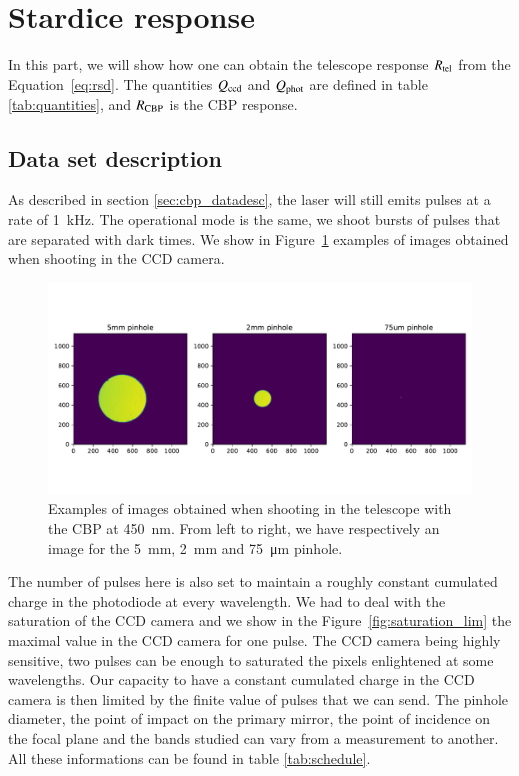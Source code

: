 \section{Stardice response}
\label{sec:rsd}

In this part, we will show how one can obtain the \SD telescope response $R_{\mathrm{tel}}$ from the Equation~\ref{eq:rsd}. The quantities $Q_{\mathrm{ccd}}$ and $Q_{\mathrm{phot}}$ are defined in table \ref{tab:quantities}, and $R_{\mathrm{CBP}}$ is the CBP response.

\subsection{Data set description}
\label{sec:sd_datadesc}

As described in section \ref{sec:cbp_datadesc}, the laser will still emits pulses at a rate of \SI{1}{\kilo\hertz}. The operational mode is the same, we shoot bursts of pulses that are separated with dark times. We show in Figure~\ref{fig:ccd_examples} examples of images obtained when shooting in the \SD CCD camera. 

\begin{figure}[h]
    \centering
    \includegraphics[width=\columnwidth]{fig/ccd_examples.pdf}
    \caption{Examples of images obtained when shooting in the \SD telescope with the CBP at \SI{450}{\nm}. From left to right, we have respectively an image for the \SI{5}{\mm}, \SI{2}{\mm} and \SI{75}{\micro\meter} pinhole.}
    \label{fig:ccd_examples}
\end{figure}

The number of pulses here is also set to maintain a roughly constant cumulated charge in the photodiode at every wavelength. We had to deal with the saturation of the CCD camera and we show in the Figure~\ref{fig:saturation_lim} the maximal value in the CCD camera for one pulse. The CCD camera being highly sensitive, two pulses can be enough to saturated the pixels enlightened at some wavelengths. Our capacity to have a constant cumulated charge in the CCD camera is then limited by the finite value of pulses that we can send. The pinhole diameter, the point of impact on the \SD primary mirror, the point of incidence on the \SD focal plane and the bands studied can vary from a measurement to another. All these informations can be found in table \ref{tab:schedule}.

